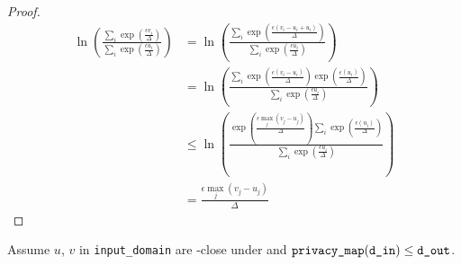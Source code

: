 \documentclass{article}
\begin{document}
\begin{proof}
\begin{align*}
    \ln\left(\frac{\sum_{i} \exp(\frac{\epsilon v_i}{\Delta})}{\sum_{i} \exp(\frac{\epsilon u_i}{\Delta})}\right)
    &= \ln\left(\frac{\sum_{i} \exp(\frac{\epsilon (v_i - u_i + u_i)}{\Delta})}{\sum_{i} \exp(\frac{\epsilon u_i}{\Delta})}\right) \\
    &= \ln\left(\frac{\sum_{i} \exp(\frac{\epsilon (v_i - u_i)}{\Delta})\exp(\frac{\epsilon (u_i)}{\Delta})}{\sum_{i} \exp(\frac{\epsilon u_i}{\Delta})}\right) \\
    &\le \ln\left(\frac{\exp(\frac{\epsilon \max_j(v_j - u_j)}{\Delta}) \sum_{i} \exp(\frac{\epsilon (u_i)}{\Delta})}{\sum_{i} \exp(\frac{\epsilon u_i}{\Delta})}\right) \\
    &= \frac{\epsilon \max_j(v_j - u_j)}{\Delta}
\end{align*}
\end{proof}

\label{privacy-guarantee}
Assume $u$, $v$ in \texttt{input\_domain} are \din-close under  and $\texttt{privacy\_map}(\texttt{d\_in}) \le \texttt{d\_out}$.
\end{document}
